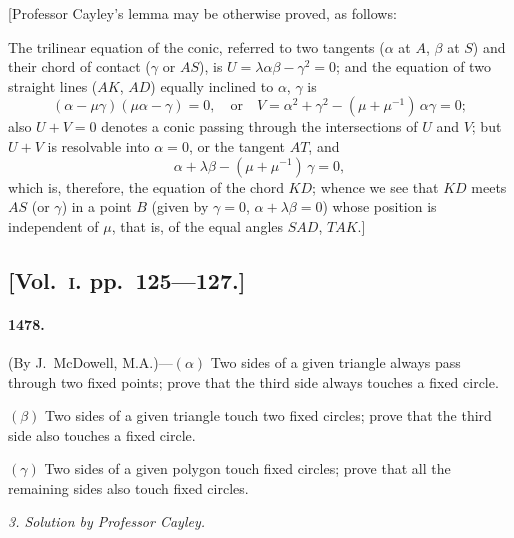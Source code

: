 \documentclass[11pt,a4paper]{article}
\begin{document}
[Professor Cayley's lemma may be otherwise proved, as follows:

The trilinear equation of the conic, referred to two tangents ($\alpha$ at $A$, $\beta$ at $S$)
and their chord of contact ($\gamma$ or $AS$), is $U=\lambda\alpha\beta-\gamma^2=0$; and the equation of two
straight lines ($AK$, $AD$) equally inclined to $\alpha$, $\gamma$ is
\[
(\alpha - \mu\gamma)(\mu\alpha - \gamma) = 0, \quad \text{or}\quad V = \alpha^2 + \gamma^2 - (\mu + \mu^{-1})\,\alpha\gamma = 0;
\]
also $U+V=0$ denotes a conic passing through the intersections of $U$ and $V$; but
$U+V$ is resolvable into $\alpha=0$, or the tangent $AT$, and
\[
\alpha + \lambda\beta - (\mu + \mu^{-1})\,\gamma = 0,
\]
which is, therefore, the equation of the chord $KD$; whence we see that $KD$ meets
$AS$ (or $\gamma$) in a point $B$ (given by $\gamma=0$, $\alpha+\lambda\beta=0$) whose position is independent of
$\mu$, that is, of the equal angles $SAD$, $TAK$.]

\subsection*{[Vol.~\textsc{i}. pp.\ 125---127.]}

\paragraph*{1478.} (By J.~McDowell, M.A.)---$(\alpha)$ Two sides of a given triangle always pass
through two fixed points; prove that the third side always touches a fixed circle.

$(\beta)$ Two sides of a given triangle touch two fixed circles; prove that the third
side also touches a fixed circle.

$(\gamma)$ Two sides of a given polygon touch fixed circles; prove that all the remaining
sides also touch fixed circles.

\begin{center}
\textit{3. Solution by Professor Cayley.}
\end{center}
\end{document}
